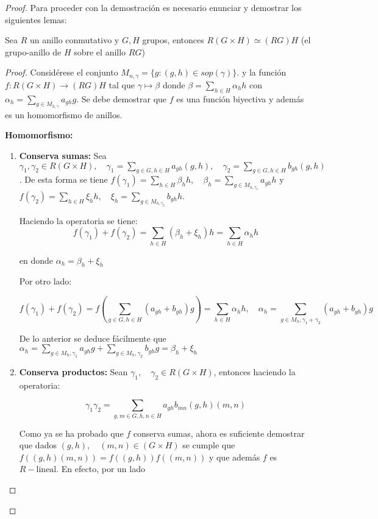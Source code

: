 \begin{proof}
Para proceder con la demostración es necesario enunciar y demostrar los siguientes lemas:

\begin{lema}\label{lema1}
Sea $R$ un anillo conmutativo y $G, H$ grupos, entonces $R(G \times H) \simeq (RG)H$ (el grupo-anillo de $H$ sobre el anillo $RG$)
\end{lema}

\begin{proof}
Considérese el conjunto $M_{n,\gamma} = \{ g: (g,h) \in sop(\gamma)\}$. y la función $f \colon R(G \times H) \to (RG)H$ tal que $\gamma \mapsto \beta $ donde $\beta = \sum_{h \in H} \alpha_hh $  con $\alpha_h = \sum_{g \in M_{h,\gamma}}a_{gh}g$. Se debe demostrar que $f$ es una función biyectiva y además es un homomorfismo de anillos.

\textbf{Homomorfismo:} 
\begin{enumerate}
\item \textbf{Conserva sumas:} Sea $\gamma_1, \gamma_2 \in R(G \times H),\quad \gamma_1 = \sum_{g \in G, h \in H}a_{gh}(g,h), \quad  \gamma_2 = \sum_{g\in G, h\in H}b_{gh}(g,h)$. De esta forma se tiene $f(\gamma_1) = \sum_{h \in H}\beta_hh, \quad \beta_h = \sum_{g\in M_{h,\gamma_1}}a_{gh}h$ y $f(\gamma_2) = \sum_{h\in H}\xi_hh,\quad \xi_h = \sum_{g \in M_{h,\gamma_2}}b_{gh}h$.

Haciendo la operatoria se tiene:
\[ f(\gamma_1) + f(\gamma_2) = \sum_{h\in H}(\beta_h+\xi_h)h = \sum_{h\in H}\alpha_hh\]

en donde $\alpha_h = \beta_h + \xi_h$

Por otro lado:

\[ f(\gamma_1) + f(\gamma_2) = f\left(\sum_{g\in G, h\in H} (a_{gh} + b_{gh})g\right) = \sum_{h \in H}\alpha_hh, \quad \alpha_h = \sum_{g \in M_h, \gamma_1 + \gamma_2}(a_{gh} + b_{gh})g  \]

De lo anterior se deduce fácilmente que $\alpha_h = \sum_{g \in M_h, \gamma_1}a_{gh}g + \sum_{g \in M_h, \gamma_2}b_{gh}g = \beta_h + \xi_h$

\item \textbf{Conserva productos:} Sean $\gamma_1,\quad \gamma_2 \in R(G \times H)$, entonces haciendo la operatoria:

\[  \gamma_1\gamma_2 = \sum_{g,m \in G, h,n \in H} a_{gh}b_{mn}(g,h)(m,n) \]

Como ya se ha probado que $f$ conserva sumas, ahora es suficiente demostrar que dados $(g,h),\quad  (m,n) \in (G \times H)$ se cumple que $f((g,h)(m,n)) = f((g,h))f((m,n))$ y que además $f$ es $R-\mbox{lineal}$. En efecto, por un lado 


\end{enumerate}
\end{proof}
\end{proof}

